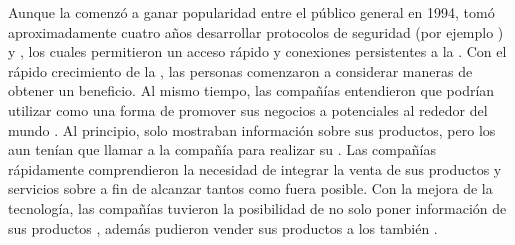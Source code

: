 		Aunque la \internetINT comenzó a ganar popularidad  entre el público general en 1994, tomó aproximadamente cuatro años desarrollar protocolos de seguridad (por ejemplo \httpNAME) y \dslModemNAME, los cuales permitieron un acceso rápido y conexiones persistentes a la \internetINT. Con el rápido crecimiento de la \internetINT, las personas comenzaron a considerar maneras de obtener un beneficio. Al mismo tiempo, las compañías entendieron que podrían utilizar \internetINT  como una forma de promover sus negocios a potenciales \customersCOM al rededor del mundo \cite{cook2015mobile}. Al principio, solo mostraban información sobre sus productos, pero los \customersCOM aun tenían que llamar a la compañía para realizar su \orderCommerce. Las compañías rápidamente comprendieron la necesidad de integrar la venta de sus productos y servicios sobre \internetINT a fin de alcanzar tantos \customersCOM como fuera posible. Con la mejora de la tecnología, las compañías tuvieron la posibilidad de no solo poner información de sus productos \online, además pudieron vender sus productos a los \customersCOM  también \cite{Maamar2003commerce}.


